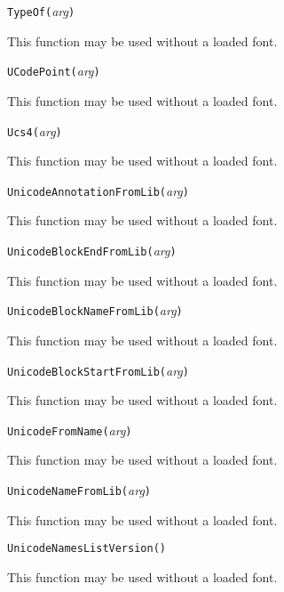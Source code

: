 
\noindent\texttt{TypeOf(}\textit{arg}\texttt{)}

This function may be used without a loaded font.


\noindent\texttt{UCodePoint(}\textit{arg}\texttt{)}

This function may be used without a loaded font.


\noindent\texttt{Ucs4(}\textit{arg}\texttt{)}

This function may be used without a loaded font.


\noindent\texttt{UnicodeAnnotationFromLib(}\textit{arg}\texttt{)}

This function may be used without a loaded font.


\noindent\texttt{UnicodeBlockEndFromLib(}\textit{arg}\texttt{)}

This function may be used without a loaded font.


\noindent\texttt{UnicodeBlockNameFromLib(}\textit{arg}\texttt{)}

This function may be used without a loaded font.


\noindent\texttt{UnicodeBlockStartFromLib(}\textit{arg}\texttt{)}

This function may be used without a loaded font.


\noindent\texttt{UnicodeFromName(}\textit{arg}\texttt{)}

This function may be used without a loaded font.


\noindent\texttt{UnicodeNameFromLib(}\textit{arg}\texttt{)}

This function may be used without a loaded font.


\noindent\texttt{UnicodeNamesListVersion(}\texttt{)}

This function may be used without a loaded font.


